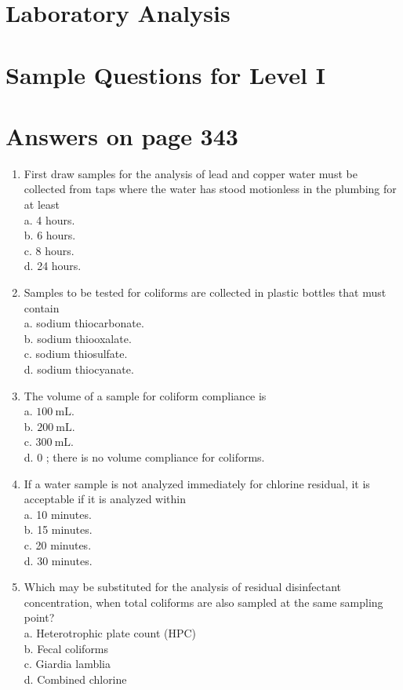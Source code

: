 \documentclass[10pt]{article}
\begin{document}
\section{Laboratory Analysis}
\section{Sample Questions for Level I}
\section{Answers on page 343}
\begin{enumerate}
  \item First draw samples for the analysis of lead and copper water must be collected from taps where the water has stood motionless in the plumbing for at least\\
a. 4 hours.\\
b. 6 hours.\\
c. 8 hours.\\
d. 24 hours.

  \item Samples to be tested for coliforms are collected in plastic bottles that must contain\\
a. sodium thiocarbonate.\\
b. sodium thiooxalate.\\
c. sodium thiosulfate.\\
d. sodium thiocyanate.

  \item The volume of a sample for coliform compliance is\\
a. $100 \mathrm{~mL}$.\\
b. $200 \mathrm{~mL}$.\\
c. $300 \mathrm{~mL}$.\\
d. 0 ; there is no volume compliance for coliforms.

  \item If a water sample is not analyzed immediately for chlorine residual, it is acceptable if it is analyzed within\\
a. 10 minutes.\\
b. 15 minutes.\\
c. 20 minutes.\\
d. 30 minutes.

  \item Which may be substituted for the analysis of residual disinfectant concentration, when total coliforms are also sampled at the same sampling point?\\
a. Heterotrophic plate count (HPC)\\
b. Fecal coliforms\\
c. Giardia lamblia\\
d. Combined chlorine

\end{enumerate}
\end{document}

